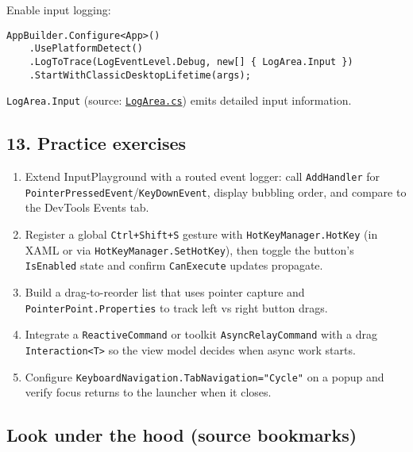 Enable input logging:

\begin{lstlisting}
AppBuilder.Configure<App>()
    .UsePlatformDetect()
    .LogToTrace(LogEventLevel.Debug, new[] { LogArea.Input })
    .StartWithClassicDesktopLifetime(args);
\end{lstlisting}

\passthrough{\lstinline!LogArea.Input!} (source:
\href{https://github.com/AvaloniaUI/Avalonia/blob/master/src/Avalonia.Base/Logging/LogArea.cs}{\passthrough{\lstinline!LogArea.cs!}})
emits detailed input information.

\subsection{13. Practice exercises}\label{practice-exercises-3}

\begin{enumerate}
\def\labelenumi{\arabic{enumi}.}
\tightlist
\item
  Extend InputPlayground with a routed event logger: call
  \passthrough{\lstinline!AddHandler!} for
  \passthrough{\lstinline!PointerPressedEvent!}/\passthrough{\lstinline!KeyDownEvent!},
  display bubbling order, and compare to the DevTools Events tab.
\item
  Register a global \passthrough{\lstinline!Ctrl+Shift+S!} gesture with
  \passthrough{\lstinline!HotKeyManager.HotKey!} (in XAML or via
  \passthrough{\lstinline!HotKeyManager.SetHotKey!}), then toggle the
  button's \passthrough{\lstinline!IsEnabled!} state and confirm
  \passthrough{\lstinline!CanExecute!} updates propagate.
\item
  Build a drag-to-reorder list that uses pointer capture and
  \passthrough{\lstinline!PointerPoint.Properties!} to track left vs
  right button drags.
\item
  Integrate a \passthrough{\lstinline!ReactiveCommand!} or toolkit
  \passthrough{\lstinline!AsyncRelayCommand!} with a drag
  \passthrough{\lstinline!Interaction<T>!} so the view model decides
  when async work starts.
\item
  Configure
  \passthrough{\lstinline!KeyboardNavigation.TabNavigation="Cycle"!} on
  a popup and verify focus returns to the launcher when it closes.
\end{enumerate}

\subsection{Look under the hood (source
bookmarks)}\label{look-under-the-hood-source-bookmarks-7}


